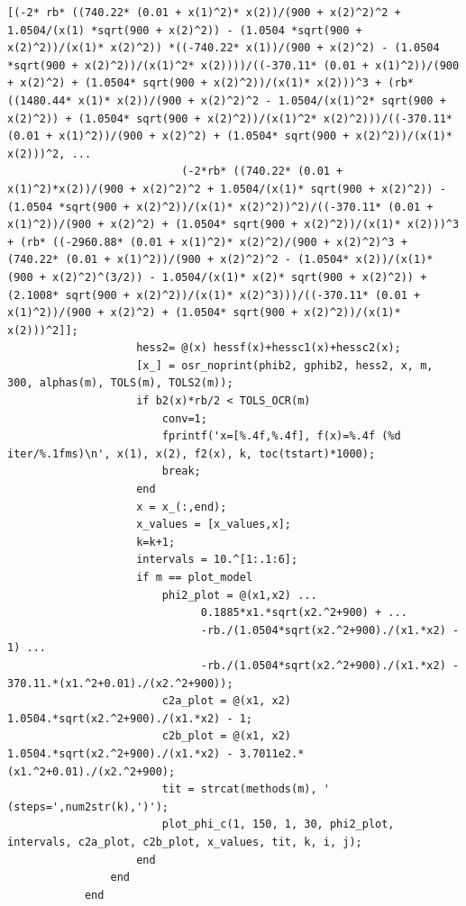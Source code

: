 \documentclass[10pt, a4paper]{article}
\begin{document}
\begin{minipage}{\linewidth}
\begin{lstlisting}[style=myStyle, caption= trecho de c\'odigo do problema 02 (barreira) (2/2), label=list_p02_bar_2]
                          [(-2* rb* ((740.22* (0.01 + x(1)^2)* x(2))/(900 + x(2)^2)^2 + 1.0504/(x(1) *sqrt(900 + x(2)^2)) - (1.0504 *sqrt(900 + x(2)^2))/(x(1)* x(2)^2)) *((-740.22* x(1))/(900 + x(2)^2) - (1.0504 *sqrt(900 + x(2)^2))/(x(1)^2* x(2))))/((-370.11* (0.01 + x(1)^2))/(900 + x(2)^2) + (1.0504* sqrt(900 + x(2)^2))/(x(1)* x(2)))^3 + (rb* ((1480.44* x(1)* x(2))/(900 + x(2)^2)^2 - 1.0504/(x(1)^2* sqrt(900 + x(2)^2)) + (1.0504* sqrt(900 + x(2)^2))/(x(1)^2* x(2)^2)))/((-370.11* (0.01 + x(1)^2))/(900 + x(2)^2) + (1.0504* sqrt(900 + x(2)^2))/(x(1)* x(2)))^2, ...
                           (-2*rb* ((740.22* (0.01 + x(1)^2)*x(2))/(900 + x(2)^2)^2 + 1.0504/(x(1)* sqrt(900 + x(2)^2)) - (1.0504 *sqrt(900 + x(2)^2))/(x(1)* x(2)^2))^2)/((-370.11* (0.01 + x(1)^2))/(900 + x(2)^2) + (1.0504* sqrt(900 + x(2)^2))/(x(1)* x(2)))^3 + (rb* ((-2960.88* (0.01 + x(1)^2)* x(2)^2)/(900 + x(2)^2)^3 + (740.22* (0.01 + x(1)^2))/(900 + x(2)^2)^2 - (1.0504* x(2))/(x(1)* (900 + x(2)^2)^(3/2)) - 1.0504/(x(1)* x(2)* sqrt(900 + x(2)^2)) + (2.1008* sqrt(900 + x(2)^2))/(x(1)* x(2)^3)))/((-370.11* (0.01 + x(1)^2))/(900 + x(2)^2) + (1.0504* sqrt(900 + x(2)^2))/(x(1)* x(2)))^2]];
                    hess2= @(x) hessf(x)+hessc1(x)+hessc2(x);
                    [x_] = osr_noprint(phib2, gphib2, hess2, x, m, 300, alphas(m), TOLS(m), TOLS2(m));
                    if b2(x)*rb/2 < TOLS_OCR(m)
                        conv=1;
                        fprintf('x=[%.4f,%.4f], f(x)=%.4f (%d iter/%.1fms)\n', x(1), x(2), f2(x), k, toc(tstart)*1000);
                        break;
                    end
                    x = x_(:,end);
                    x_values = [x_values,x];
                    k=k+1;
                    intervals = 10.^[1:.1:6];
                    if m == plot_model
                        phi2_plot = @(x1,x2) ...
                              0.1885*x1.*sqrt(x2.^2+900) + ...
                              -rb./(1.0504*sqrt(x2.^2+900)./(x1.*x2) - 1) ...
                              -rb./(1.0504*sqrt(x2.^2+900)./(x1.*x2) - 370.11.*(x1.^2+0.01)./(x2.^2+900));
                        c2a_plot = @(x1, x2) 1.0504.*sqrt(x2.^2+900)./(x1.*x2) - 1;
                        c2b_plot = @(x1, x2) 1.0504.*sqrt(x2.^2+900)./(x1.*x2) - 3.7011e2.*(x1.^2+0.01)./(x2.^2+900);
                        tit = strcat(methods(m), ' (steps=',num2str(k),')');
                        plot_phi_c(1, 150, 1, 30, phi2_plot, intervals, c2a_plot, c2b_plot, x_values, tit, k, i, j);
                    end
                end
            end
      \end{lstlisting}
\end{minipage}
\end{document}
